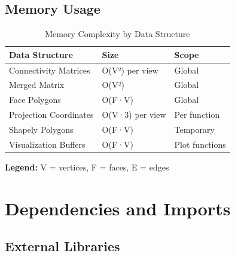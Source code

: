 \documentclass[11pt,a4paper]{article}
\begin{document}
\subsection{Memory Usage}

\begin{table}[htbp]
\centering
\begin{tabular}{lll}
\toprule
\textbf{Data Structure} & \textbf{Size} & \textbf{Scope} \\
\midrule
Connectivity Matrices & O(V²) per view & Global \\
Merged Matrix & O(V²) & Global \\
Face Polygons & O(F·V) & Global \\
Projection Coordinates & O(V·3) per view & Per function \\
Shapely Polygons & O(F·V) & Temporary \\
Visualization Buffers & O(F·V) & Plot functions \\
\bottomrule
\end{tabular}
\caption{Memory Complexity by Data Structure}
\label{tab:memory}
\end{table}

\textbf{Legend:} V = vertices, F = faces, E = edges

\newpage
\section{Dependencies and Imports}

\subsection{External Libraries}
\end{document}

